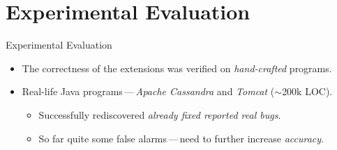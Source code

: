 \documentclass[%
    10pt, xcolor=pdflatex, hyperref={unicode}, aspectratio=169%
]{beamer}
\begin{document}
\section{Experimental Evaluation}
\begin{frame}{Experimental Evaluation}
    \begin{itemize}\setlength\itemsep{3em}
        \item
            The \alert{correctness} of the extensions was verified on
            \emph{hand-crafted} programs.

        \item
            \alert{Real-life Java} programs\,---\,\emph{Apache Cassandra}
            and \emph{Tomcat} ($ \sim $200k LOC).
            \bigskip
            \begin{itemize}\setlength\itemsep{2em}
                \item
                    Successfully \alert{rediscovered} \emph{already fixed
                    reported real bugs}.

                \item
                    So far quite some \alert{false alarms}\,---\,need
                    to further increase \emph{accuracy}.
            \end{itemize}
    \end{itemize}
\end{frame}


\end{document}
